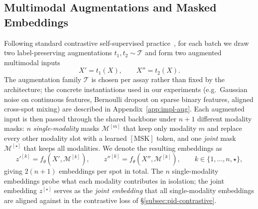 \documentclass{article}
\theoremstyle{plain}
\theoremstyle{definition}
\begin{document}
\subsection{Multimodal Augmentations and Masked Embeddings}
\label{subsec:augmentations}
Following standard contrastive self-supervised practice~\cite{chen2020simple,tian2020contrastive}, for each batch we draw two label-preserving augmentations $t_1, t_2 \sim \mathcal{T}$ and form two augmented multimodal inputs
\begin{equation}
X' = t_1(X), \qquad X'' = t_2(X).
\end{equation}
The augmentation family $\mathcal{T}$ is chosen per assay rather than fixed by the architecture; the concrete instantiations used in our experiments (e.g.\ Gaussian noise on continuous features, Bernoulli dropout on sparse binary features, aligned cross-spot mixing) are described in Appendix~\ref{app:impl-aug}. Each augmented input is then passed through the shared backbone under $n + 1$ different modality masks: $n$ \emph{single-modality} masks $\mathcal{M}^{[m]}$ that keep only modality $m$ and replace every other modality slot with a learned $[\mathrm{MSK}]$ token, and one \emph{joint} mask $\mathcal{M}^{[\star]}$ that keeps all modalities. We denote the resulting embeddings as
\begin{equation}
z'^{[k]} = f_\theta(X', \mathcal{M}^{[k]}), \qquad z''^{[k]} = f_\theta(X'', \mathcal{M}^{[k]}), \qquad k \in \{1, \ldots, n, \star\},
\end{equation}
giving $2(n+1)$ embeddings per spot in total. The $n$ single-modality embeddings probe what each modality contributes in isolation; the joint embedding $z^{[\star]}$ serves as the \emph{joint embedding} that all single-modality embeddings are aligned against in the contrastive loss of \S\ref{subsec:pid-contrastive}.
\end{document}
